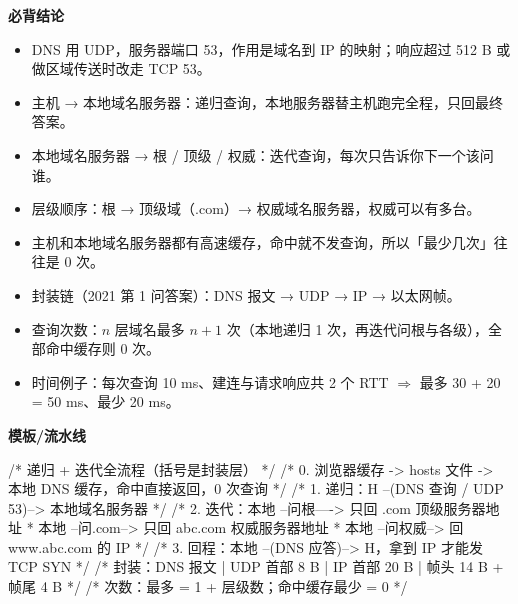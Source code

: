 \documentclass[10pt,a4paper]{ctexart}
\begin{document}



\textbf{必背结论}

\begin{itemize}

\item DNS 用 UDP，服务器端口 53，作用是域名到 IP 的映射；响应超过 512 B 或做区域传送时改走 TCP 53。

\item 主机 → 本地域名服务器：递归查询，本地服务器替主机跑完全程，只回最终答案。

\item 本地域名服务器 → 根 / 顶级 / 权威：迭代查询，每次只告诉你下一个该问谁。

\item 层级顺序：根 → 顶级域（.com）→ 权威域名服务器，权威可以有多台。

\item 主机和本地域名服务器都有高速缓存，命中就不发查询，所以「最少几次」往往是 0 次。

\item 封装链（2021 第 1 问答案）：DNS 报文 → UDP → IP → 以太网帧。

\item 查询次数：$n$ 层域名最多 $n+1$ 次（本地递归 1 次，再迭代问根与各级），全部命中缓存则 0 次。

\item 时间例子：每次查询 10 ms、建连与请求响应共 2 个 RTT $\Rightarrow$ 最多 30 + 20 = 50 ms、最少 20 ms。

\end{itemize}

\textbf{模板/流水线}

\begin{codebox}
/* 递归 + 迭代全流程（括号是封装层） */
/* 0. 浏览器缓存 -> hosts 文件 -> 本地 DNS 缓存，命中直接返回，0 次查询 */
/* 1. 递归：H --(DNS 查询 / UDP 53)--> 本地域名服务器 */
/* 2. 迭代：本地 --问根----> 只回 .com 顶级服务器地址
 *          本地 --问.com--> 只回 abc.com 权威服务器地址
 *          本地 --问权威--> 回 www.abc.com 的 IP
 */
/* 3. 回程：本地 --(DNS 应答)--> H，拿到 IP 才能发 TCP SYN */
/* 封装：DNS 报文 | UDP 首部 8 B | IP 首部 20 B | 帧头 14 B + 帧尾 4 B */
/* 次数：最多 = 1 + 层级数；命中缓存最少 = 0 */
\end{codebox}
\end{document}
